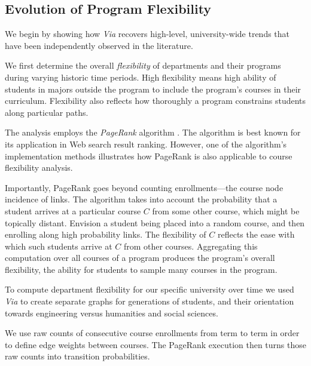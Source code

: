 \subsection{Evolution of Program Flexibility}
\label{sec:course_pref_evolution}

We begin by showing how {\em Via} recovers high-level, university-wide
trends that have been independently observed in the literature.

We first determine the overall {\em flexibility} of departments and
their programs during varying historic time periods. High flexibility
means high ability of students in majors outside the program to
include the program's courses in their curriculum. Flexibility also
reflects how thoroughly a program constrains students along particular
paths.

The analysis employs the {\em PageRank} algorithm \cite{Page1999}. The
algorithm is best known for its application in Web search result
ranking. However, one of the algorithm's implementation methods
illustrates how PageRank is also applicable to course flexibility
analysis.

Importantly, PageRank goes beyond counting enrollments---the course
node incidence of links. The algorithm takes into account the
probability that a student arrives at a particular course $C$ from
some other course, which might be topically distant. Envision a
student being placed into a random course, and then enrolling along
high probability links. The flexibility of $C$ reflects the ease with
which such students arrive at $C$ from other courses. Aggregating this
computation over all courses of a program produces the program's
overall flexibility, the ability for students to sample many courses
in the program.

To compute department flexibility for our specific university over
time we used {\em Via} to create separate graphs for generations of
students, and their orientation towards engineering versus humanities
and social sciences.

We use raw counts of consecutive course enrollments from
term to term in order to define edge weights between courses. The
PageRank execution then turns those raw counts into transition
probabilities.

